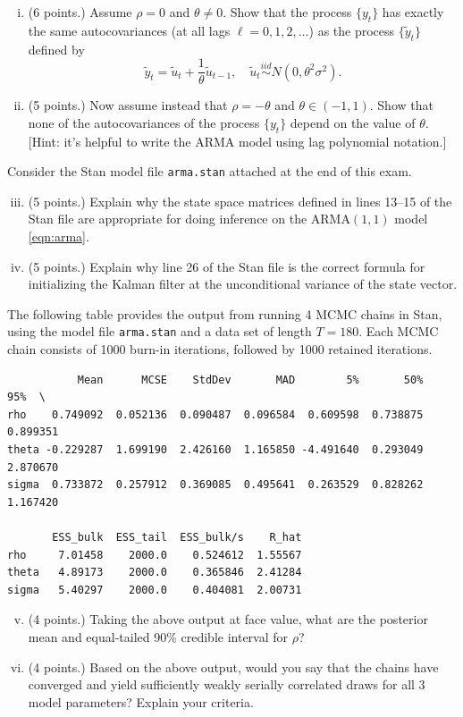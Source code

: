 \documentclass[12pt]{article}
\begin{document}
\begin{enumerate}[i)]
\item (6 points.) Assume $\rho=0$ and $\theta \neq 0$. Show that the process $\lbrace y_t \rbrace$ has exactly the same autocovariances (at all lags $\ell=0,1,2,\dots$) as the process $\lbrace \tilde{y}_t \rbrace$ defined by
\[\tilde{y}_t = \tilde{u}_t + \frac{1}{\theta}\tilde{u}_{t-1},\quad \tilde{u}_t \overset{iid}{\sim} N(0,\theta^2\sigma^2).\]
\item (5 points.) Now assume instead that $\rho=-\theta$ and $\theta \in (-1,1)$. Show that none of the autocovariances of the process $\lbrace y_t \rbrace$ depend on the value of $\theta$. [Hint: it's helpful to write the ARMA model using lag polynomial notation.]
\end{enumerate}

\noindent Consider the Stan model file \texttt{arma.stan} attached at the end of this exam.
\begin{enumerate}[i)]
\setcounter{enumi}{2}
\item (5 points.) Explain why the state space matrices defined in lines 13--15 of the Stan file are appropriate for doing inference on the ARMA$(1,1)$ model \eqref{eqn:arma}.
\item (5 points.) Explain why line 26 of the Stan file is the correct formula for initializing the Kalman filter at the unconditional variance of the state vector.
\end{enumerate}

\noindent The following table provides the output from running 4 MCMC chains in Stan, using the model file \texttt{arma.stan} and a data set of length $T=180$. Each MCMC chain consists of 1000 burn-in iterations, followed by 1000 retained iterations.

{\small {}
\begin{verbatim}
           Mean      MCSE    StdDev       MAD        5%       50%       95%  \
rho    0.749092  0.052136  0.090487  0.096584  0.609598  0.738875  0.899351   
theta -0.229287  1.699190  2.426160  1.165850 -4.491640  0.293049  2.870670   
sigma  0.733872  0.257912  0.369085  0.495641  0.263529  0.828262  1.167420   

       ESS_bulk  ESS_tail  ESS_bulk/s    R_hat  
rho     7.01458    2000.0    0.524612  1.55567  
theta   4.89173    2000.0    0.365846  2.41284  
sigma   5.40297    2000.0    0.404081  2.00731
\end{verbatim}
}

\begin{enumerate}[i)]
\setcounter{enumi}{4}
\item (4 points.) Taking the above output at face value, what are the posterior mean and equal-tailed 90\% credible interval for $\rho$?
\item (4 points.) Based on the above output, would you say that the chains have converged and yield sufficiently weakly serially correlated draws for all 3 model parameters? Explain your criteria.
\end{enumerate}
\end{document}
